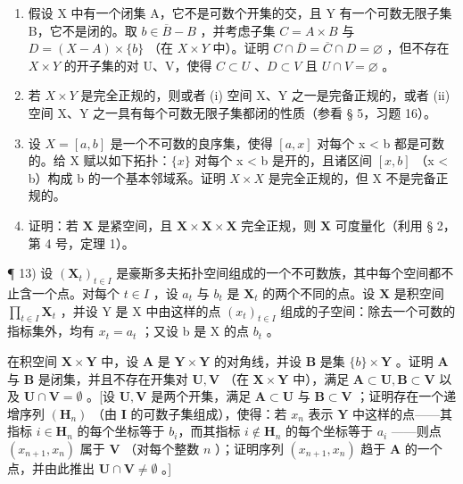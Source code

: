 \begin{enumerate}
\def\labelenumi{\alph{enumi})}
\item
  假设 X 中有一个闭集 A，它不是可数个开集的交，且 Y 有一个可数无限子集 B，它不是闭的。取 \(b \in \overline{B} - B\) ，并考虑子集 \(C = A \times B\) 与 \(D = (X - A) \times \{b\}\) （在 \(X \times Y\) 中）。证明 \(C \cap \overline{D} = \overline{C} \cap D = \varnothing\) ，但不存在 \(X \times Y\) 的开子集的对 U、V，使得 \(C \subset U\) 、\(D \subset V\) 且 \(U \cap V = \varnothing\) 。
\item
  若 \(X \times Y\) 是完全正规的，则或者 (i) 空间 X、Y 之一是完备正规的，或者 (ii) 空间 X、Y 之一具有每个可数无限子集都闭的性质（参看 § 5，习题 16）。
\item
  设 \(X = [a, b]\) 是一个不可数的良序集，使得 \([a, x]\) 对每个 x \textless{} b 都是可数的。给 X 赋以如下拓扑：\(\{x\}\) 对每个 x \textless{} b 是开的，且诸区间 \([x, b]\) （x \textless{} b）构成 b 的一个基本邻域系。证明 \(X \times X\) 是完全正规的，但 X 不是完备正规的。
\item
  证明：若 \(\mathbf{X}\) 是紧空间，且 \(\mathbf{X} \times \mathbf{X} \times \mathbf{X}\) 完全正规，则 \(\mathbf{X}\) 可度量化（利用 § 2，第 4 号，定理 1）。
\end{enumerate}

¶ 13) 设 \((\mathbf{X}_{t})_{t\in I}\) 是豪斯多夫拓扑空间组成的一个不可数族，其中每个空间都不止含一个点。对每个 \(t\in I\) ，设 \(a_{t}\) 与 \(b_{t}\) 是 \(\mathbf{X}_{t}\) 的两个不同的点。设 \(\mathbf{X}\) 是积空间 \(\prod_{t\in I}\mathbf{X}_{t}\) ，并设 Y 是 X 中由这样的点 \((x_{t})_{t\in I}\) 组成的子空间：除去一个可数的指标集外，均有 \(x_{t}=a_{t}\) ；又设 b 是 X 的点 \(b_{t}\) 。

在积空间 \(\mathbf{X} \times \mathbf{Y}\) 中，设 \(\mathbf{A}\) 是 \(\mathbf{Y} \times \mathbf{Y}\) 的对角线，并设 \(\mathbf{B}\) 是集 \(\{b\} \times \mathbf{Y}\) 。证明 \(\mathbf{A}\) 与 \(\mathbf{B}\) 是闭集，并且不存在开集对 \(\mathbf{U}, \mathbf{V}\) （在 \(\mathbf{X} \times \mathbf{Y}\) 中），满足 \(\mathbf{A} \subset \mathbf{U}, \mathbf{B} \subset \mathbf{V}\) 以及 \(\mathbf{U} \cap \mathbf{V} = \emptyset\) 。{[}设 \(\mathbf{U}, \mathbf{V}\) 是两个开集，满足 \(\mathbf{A} \subset \mathbf{U}\) 与 \(\mathbf{B} \subset \mathbf{V}\) ；证明存在一个递增序列 \((\mathbf{H}_n)\) （由 \(\mathbf{I}\) 的可数子集组成），使得：若 \(x_n\) 表示 \(\mathbf{Y}\) 中这样的点——其指标 \(i \in \mathbf{H}_n\) 的每个坐标等于 \(b_i\)，而其指标 \(i \notin \mathbf{H}_n\) 的每个坐标等于 \(a_i\) ——则点 \((x_{n+1}, x_n)\) 属于 \(\mathbf{V}\) （对每个整数 \(n\) ）；证明序列 \((x_{n+1}, x_n)\) 趋于 \(\mathbf{A}\) 的一个点，并由此推出 \(\mathbf{U} \cap \mathbf{V} \neq \emptyset\) 。{]}


